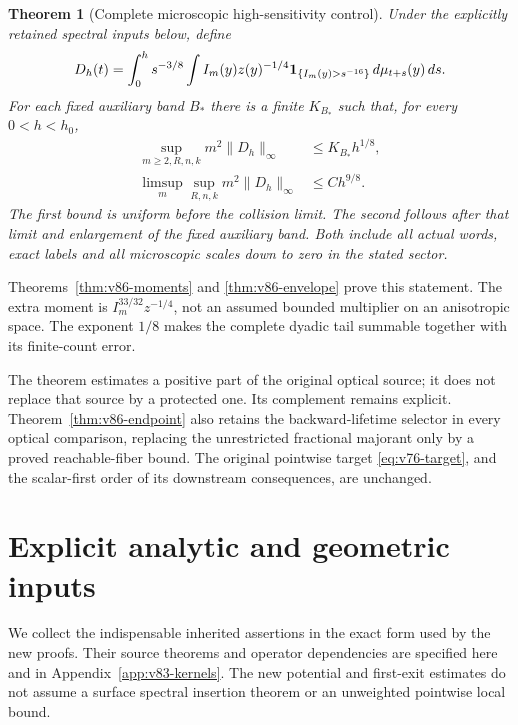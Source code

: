 \documentclass[11pt,reqno]{amsart}
\numberwithin{equation}{section}
\newtheorem{theorem}{Theorem}[section]
\theoremstyle{definition}\newtheorem{definition}[theorem]{Definition}
\theoremstyle{remark}\newtheorem{remark}[theorem]{Remark}
\theoremstyle{definition}\newtheorem{inputstatement}[theorem]{Input statement}
\begin{document}
\begin{theorem}[Complete microscopic high-sensitivity control]
\label{thm:v86-main}
Under the explicitly retained spectral inputs below, define
\[
 D_h(t)=\int_0^h s^{-3/8}\int I_m(y)z(y)^{-1/4}
                     \mathbf1_{\{I_m(y)>s^{-16}\}}\,d\mu_{t+s}(y)\,ds.
\]
For each fixed auxiliary band $B_*$ there is a finite $K_{B_*}$ such
that, for every $0<h<h_0$,
\begin{align}
 \sup_{m\ge2,R,n,k}m^2\|D_h\|_\infty&\le K_{B_*}h^{1/8},
                                          \label{eq:v86-main-uniform}\\
 \limsup_m\sup_{R,n,k}m^2\|D_h\|_\infty&\le Ch^{9/8}.
                                          \label{eq:v86-main-ordered}
\end{align}
The first bound is uniform before the collision limit. The second
follows after that limit and enlargement of the fixed auxiliary band.
Both include all actual words, exact labels and all microscopic
scales down to zero in the stated sector.
\end{theorem}
Theorems~\ref{thm:v86-moments} and \ref{thm:v86-envelope} prove this
statement. The extra moment is $I_m^{33/32}z^{-1/4}$, not an assumed
bounded multiplier on an anisotropic space. The exponent $1/8$ makes
the complete dyadic tail summable together with its finite-count error.

The theorem estimates a positive part of the original optical source;
it does not replace that source by a protected one. Its complement
remains explicit. Theorem~\ref{thm:v86-endpoint} also retains the
backward-lifetime selector in every optical comparison, replacing the
unrestricted fractional majorant only by a proved reachable-fiber
bound. The original pointwise target \eqref{eq:v76-target}, and the
scalar-first order of its downstream consequences, are unchanged.

\section{Explicit analytic and geometric inputs}
We collect the indispensable inherited assertions in the exact form
used by the new proofs. Their source theorems and operator dependencies
are specified here and in Appendix~\ref{app:v83-kernels}. The new
potential and first-exit estimates do not assume a surface spectral
insertion theorem or an unweighted pointwise local bound.
\end{document}
